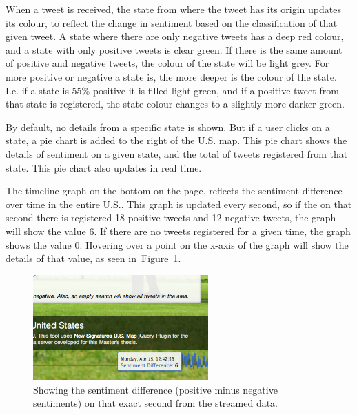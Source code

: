 When a tweet is received, the state from where the tweet has its origin updates its colour, to reflect the change in sentiment based on the classification of that given tweet. A state where there are only negative tweets has a deep red colour, and a state with only positive tweets is clear green. If there is the same amount of positive and negative tweets, the colour of the state will be light grey. For more positive or negative a state is, the more deeper is the colour of the state. I.e. if a state is 55\% positive it is filled light green, and if a positive tweet from that state is registered, the state colour changes to a slightly more darker green.

By default, no details from a specific state is shown. But if a user clicks on a state, a pie chart is added to the right of the U.S. map. This pie chart shows the details of sentiment on a given state, and the total of tweets registered from that state. This pie chart also updates in real time.

The timeline graph on the bottom on the page, reflects the sentiment difference over time in the entire U.S.. This graph is updated every second, so if the on that second there is registered 18 positive tweets and 12 negative tweets, the graph will show the value 6. If there are no tweets registered for a given time, the graph shows the value 0. Hovering over a point on the x-axis of the graph will show the details of that value, as seen in~Figure~\ref{fig:sentimap_screenshot_timeline}.

\begin{figure}[htb!]
\begin{center}
 \includegraphics[width=0.6\textwidth]{../img/sentimap_screenshot_timeline.png}
 \caption[SentiMap timeline screen shot]{Showing the sentiment difference (positive minus negative sentiments) on that exact second from the streamed data.}
 \label{fig:sentimap_screenshot_timeline}
\end{center}
\end{figure}

